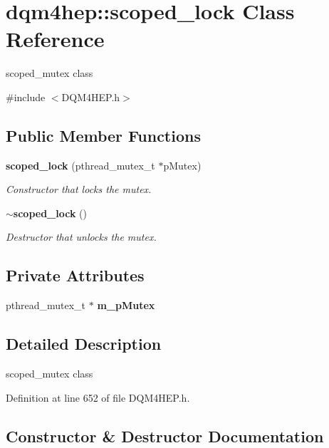 \section{dqm4hep\+:\+:scoped\+\_\+lock Class Reference}
\label{classdqm4hep_1_1scoped__lock}


scoped\+\_\+mutex class  




{\ttfamily \#include $<$D\+Q\+M4\+H\+E\+P.\+h$>$}

\subsection*{Public Member Functions}
\begin{DoxyCompactItemize}
\item 
{\bf scoped\+\_\+lock} (pthread\+\_\+mutex\+\_\+t $\ast$p\+Mutex)
\begin{DoxyCompactList}\small\item\em Constructor that locks the mutex. \end{DoxyCompactList}\item 
{\bf $\sim$scoped\+\_\+lock} ()
\begin{DoxyCompactList}\small\item\em Destructor that unlocks the mutex. \end{DoxyCompactList}\end{DoxyCompactItemize}
\subsection*{Private Attributes}
\begin{DoxyCompactItemize}
\item 
pthread\+\_\+mutex\+\_\+t $\ast$ {\bf m\+\_\+p\+Mutex}
\end{DoxyCompactItemize}


\subsection{Detailed Description}
scoped\+\_\+mutex class 

Definition at line 652 of file D\+Q\+M4\+H\+E\+P.\+h.



\subsection{Constructor \& Destructor Documentation}
